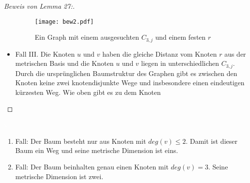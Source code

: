\begin{proof}[Beweis von Lemma 27:]
\begin{itemize}
\begin{figure}[h!]
		\centering
 		 \texttt{[image: bew2.pdf]}
   \caption{Ein Graph mit einem ausgesuchten $C_{3,j}$ und einem festen $r$}
  	 \end{figure}
  	 
\item Fall III. Die Knoten $u$ und $v$ haben die gleiche Distanz vom Knoten $r$ aus der metrischen Basis und die Knoten $u$ und $v$ liegen in unterschiedlichen $C_{3,j}$.\\
Durch die ursprünglichen Baumstruktur des Graphen gibt es zwischen den Knoten keine zwei knotendisjunkte Wege und insbesondere einen eindeutigen kürzesten Weg. Wie oben gibt es zu dem Knoten
\end{itemize}
\end{proof}
\begin{lem}
\textcolor{white}{x}
\begin{enumerate}
\item Fall: Der Baum besteht nur aus Knoten mit $deg(v) \leq 2$. Damit ist dieser Baum ein Weg und seine metrische Dimension ist eins.\\
\item Fall: Der Baum beinhalten genau einen Knoten mit $deg(v)=3$. Seine metrische Dimension ist zwei.
\end{enumerate}
\end{lem}
\newpage

